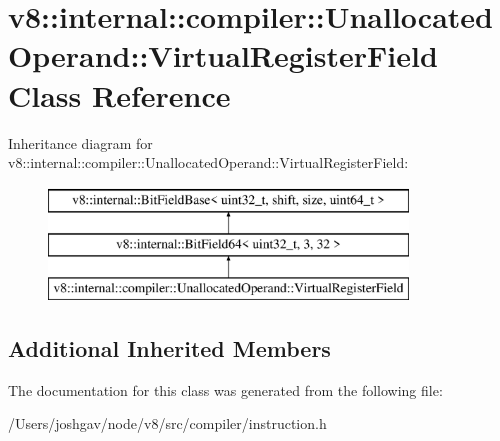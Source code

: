 \hypertarget{classv8_1_1internal_1_1compiler_1_1_unallocated_operand_1_1_virtual_register_field}{}\section{v8\+:\+:internal\+:\+:compiler\+:\+:Unallocated\+Operand\+:\+:Virtual\+Register\+Field Class Reference}
\label{classv8_1_1internal_1_1compiler_1_1_unallocated_operand_1_1_virtual_register_field}
Inheritance diagram for v8\+:\+:internal\+:\+:compiler\+:\+:Unallocated\+Operand\+:\+:Virtual\+Register\+Field\+:\begin{figure}[H]
\begin{center}
\leavevmode
\includegraphics[height=3.000000cm]{classv8_1_1internal_1_1compiler_1_1_unallocated_operand_1_1_virtual_register_field}
\end{center}
\end{figure}
\subsection*{Additional Inherited Members}


The documentation for this class was generated from the following file\+:\begin{DoxyCompactItemize}
\item 
/\+Users/joshgav/node/v8/src/compiler/instruction.\+h\end{DoxyCompactItemize}
